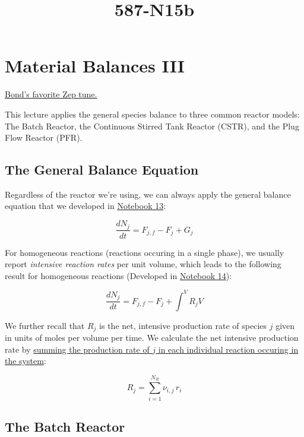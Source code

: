 \documentclass[11pt]{article}
\title{587-N15b}
\begin{document}
    
    \maketitle
    
    

    
    \hypertarget{material-balances-iii}{%
\section{Material Balances III}\label{material-balances-iii}}

\href{https://www.youtube.com/watch?v=TSM0jj-hZtw\&list=RDTSM0jj-hZtw\&start_radio=1}{Bond's
favorite Zep tune.}

This lecture applies the general species balance to three common reactor
models: The Batch Reactor, the Continuous Stirred Tank Reactor (CSTR),
and the Plug Flow Reactor (PFR).

    \hypertarget{the-general-balance-equation}{%
\subsection{The General Balance
Equation}\label{the-general-balance-equation}}

Regardless of the reactor we're using, we can always apply the general
balance equation that we developed in
\href{https://jqbond.github.io/CEN587/Notebooks/587-N13.html\#developing-a-material-balance-for-a-reacting-system}{Notebook
13}:

\[\frac{dN_j}{dt} = F_{j,f} - F_j + G_j\]

For homogeneous reactions (reactions occuring in a single phase), we
usually report \emph{intensive reaction rates} per unit volume, which
leads to the following result for homogeneous reactions (Developed in
\href{https://jqbond.github.io/CEN587/Notebooks/587-N14.html\#doing-this-for-a-real-reactor}{Notebook
14}):

\[\frac{dN_j}{dt} = F_{j,f} - F_j + \int^V R_jV\]

We further recall that \(R_j\) is the net, intensive production rate of
species \(j\) given in units of moles per volume per time. We calculate
the net intensive production rate by
\href{https://jqbond.github.io/CEN587/Notebooks/587-N14.html\#multiple-reactions}{summing
the production rate of \(j\) in each individual reaction occuring in the
system}:

\[R_j = \sum_{i = 1}^{N_R} \nu_{i,j} \, r_i\]

    \hypertarget{the-batch-reactor}{%
\subsection{The Batch Reactor}\label{the-batch-reactor}}
\end{document}
